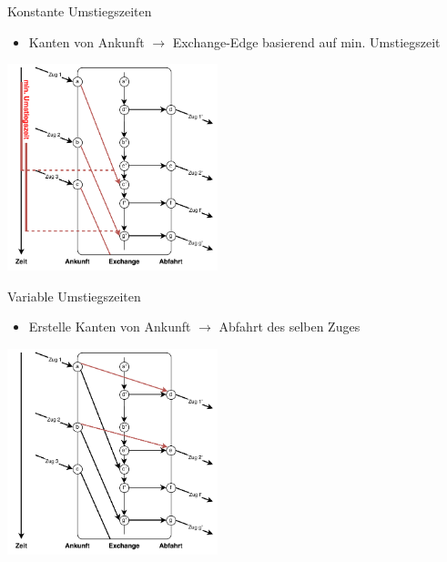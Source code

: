 \begin{frame}{Konstante Umstiegszeiten}
	\begin{itemize}
		\item Kanten von Ankunft $\rightarrow$ Exchange-Edge basierend auf min. Umstiegszeit
	\end{itemize}

	\begin{center}
		\includegraphics[height=6cm]{images/time_expanded_constant_interchange_2.pdf} 
	\end{center}
\end{frame}


\begin{frame}{Variable Umstiegszeiten}
	\begin{itemize}
		 \item Erstelle Kanten von Ankunft $\rightarrow$ Abfahrt des selben Zuges
	\end{itemize}

	\begin{center}
		\includegraphics[height=6cm]{images/time_expanded_constant_interchange_3.pdf} 
	\end{center}
\end{frame}



